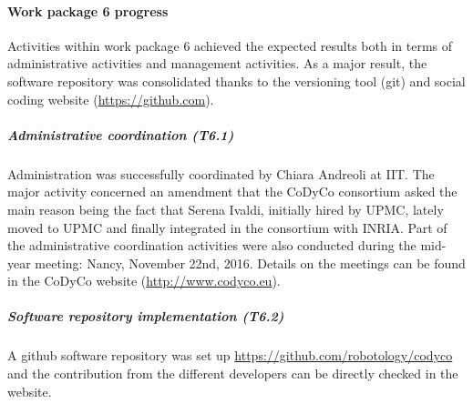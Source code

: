 

\paragraph{Work package 6 progress}

Activities within work package 6 achieved the expected results both in terms of administrative activities and management activities. As a major result, the software repository was consolidated thanks to the versioning tool (git) and social coding website (\url{https://github.com}).

\subparagraph{Administrative coordination (T6.1)}
Administration was successfully coordinated by Chiara Andreoli at IIT. The major activity concerned an amendment that the CoDyCo consortium asked the main reason being the fact that Serena Ivaldi, initially hired by UPMC, lately moved to UPMC and finally integrated in the consortium with INRIA. Part of the administrative coordination activities were also conducted during the mid-year meeting: Nancy, November 22nd, 2016. Details on the meetings can be found in the CoDyCo website (\url{http://www.codyco.eu}).

\subparagraph{Software repository implementation (T6.2)}

A github software repository was set up \url{https://github.com/robotology/codyco} and the contribution from the different developers can be directly checked in the website.
